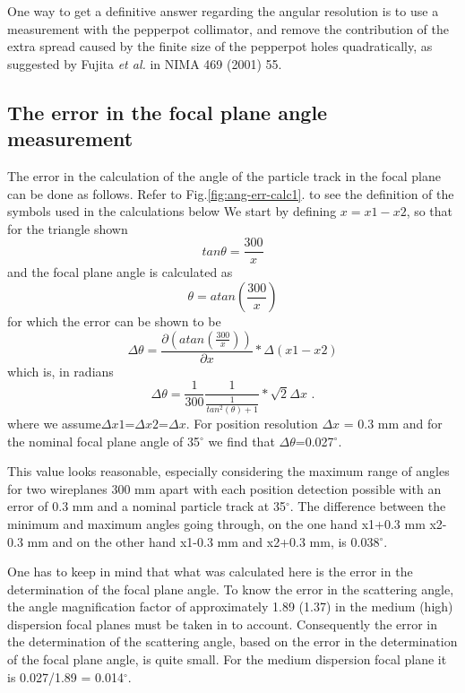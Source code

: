 \documentclass[11pt]{report}
\begin{document}
One way to get a definitive answer regarding the angular resolution is to use
a measurement with the pepperpot collimator, and remove the contribution of the extra spread caused by the finite
size of the pepperpot holes quadratically, as suggested by Fujita {\it et al.} in  NIMA 469 (2001) 55.

\subsection{The error in the focal plane angle measurement}

The error in the calculation of the angle of the particle track in the focal plane 
can be done as follows. Refer to  Fig.\ref{fig:ang-err-calc1}.
to see the definition of the symbols used in the calculations below
%
We start by defining $x = x1 -x2$, so that for the triangle shown
\begin{equation} 
tan\theta =\frac{300}{x}
\end{equation} 
and the focal plane angle is calculated as 
\begin{equation} 
\theta = atan (\frac{300}{x})
\end{equation} 
for which the error can be shown to be
\begin{equation} 
\Delta\theta =\frac{\partial ( atan(\frac{300}{x}))}{\partial x} * \Delta (x1 - x2)  
\end{equation} 
which is, in radians 
\begin{equation} 
\Delta\theta =\frac{1}{300}  \frac{1} { \frac{1}{tan^2(\theta)+1} } * \sqrt{2}\Delta x    \textrm{  .}
\end{equation} 
where we assume$\Delta x1$=$\Delta x2$=$\Delta x$. 
For position resolution $\Delta x$ = 0.3 mm and for the nominal focal plane angle of 35$^{\circ}$ we find that
$\Delta\theta$=0.027$^{\circ}$.

This value looks reasonable, especially considering the maximum range of angles for two wireplanes 300 mm apart
with each position detection possible with an error of 0.3 mm and a nominal particle track at 35$^{\circ}$. 
The difference between the minimum and maximum angles going through, on the one hand x1+0.3 mm  x2-0.3 mm and 
on the other hand x1-0.3 mm and x2+0.3 mm, is 0.038$^{\circ}$.

One has to keep in mind that what was calculated here is the error in the determination of the focal plane angle.
To know the error in the scattering angle, the angle magnification factor of approximately 1.89 (1.37) in the medium
(high) dispersion focal planes must be taken in to account. Consequently the error in the determination of the 
scattering angle, based on the error in the determination of the focal plane angle, is quite small. For the medium 
dispersion focal plane it is 0.027/1.89 = 0.014$^{\circ}$. 
\end{document}
